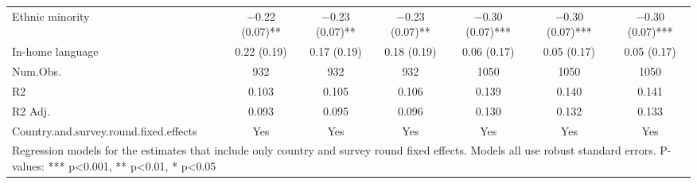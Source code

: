 \begin{table}[H]
\begin{tabular}[t]{lcccccc}
Ethnic minority & \num{-0.22} (\num{0.07})** & \num{-0.23} (\num{0.07})** & \num{-0.23} (\num{0.07})** & \num{-0.30} (\num{0.07})*** & \num{-0.30} (\num{0.07})*** & \num{-0.30} (\num{0.07})***\\
In-home language & \num{0.22} (\num{0.19}) & \num{0.17} (\num{0.19}) & \num{0.18} (\num{0.19}) & \num{0.06} (\num{0.17}) & \num{0.05} (\num{0.17}) & \num{0.05} (\num{0.17})\\
\midrule
Num.Obs. & \num{932} & \num{932} & \num{932} & \num{1050} & \num{1050} & \num{1050}\\
R2 & \num{0.103} & \num{0.105} & \num{0.106} & \num{0.139} & \num{0.140} & \num{0.141}\\
R2 Adj. & \num{0.093} & \num{0.095} & \num{0.096} & \num{0.130} & \num{0.132} & \num{0.133}\\
Country.and.survey.round.fixed.effects & Yes & Yes & Yes & Yes & Yes & Yes\\
\bottomrule
\multicolumn{7}{l}{\rule{0pt}{1em}Regression models for the estimates that include only country and survey round fixed effects. Models all use robust standard errors. P-values: *** p<0.001, ** p<0.01, * p<0.05}\\
\end{tabular}
\end{table}
